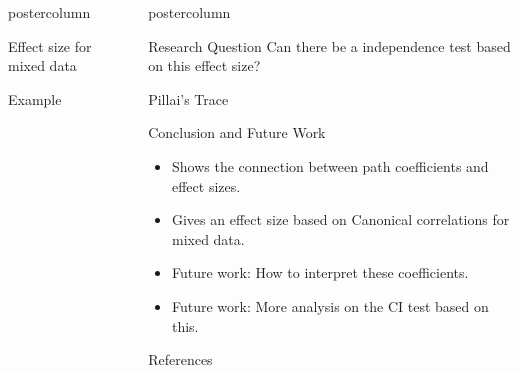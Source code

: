 \documentclass{beamer}
\newlength{\columnheight}
\begin{document}
\begin{frame}
\begin{columns}
\begin{column}{.33\textwidth}
\begin{beamercolorbox}[center]{postercolumn}
\begin{minipage}{.98\textwidth}
{\begin{myblock}{Effect size for mixed data}
	\end{myblock}\vfill
	\begin{myblock}{Example}
	\end{myblock}
		}\end{minipage}\end{beamercolorbox}
	\end{column}


	\begin{column}{0.33\textwidth}
		\begin{beamercolorbox}[center]{postercolumn}
			\begin{minipage}{.98\textwidth} %
				\parbox[t][\columnheight]{\textwidth}{ %
	\begin{myblock}{Research Question}
		Can there be a independence test based on this effect size?
	\end{myblock}\vfill
	\begin{myblock}{Pillai's Trace}
	\end{myblock}\vfill
	\begin{myblock}{Conclusion and Future Work}
		\begin{itemize}
			\item Shows the connection between path coefficients and effect sizes.
			\item Gives an effect size based on Canonical correlations for mixed data.
			\item Future work: How to interpret these coefficients.
			\item Future work: More analysis on the CI test based on this.
		\end{itemize}
	\end{myblock}\vfill
	\begin{myblock}{References}
		\footnotesize
		
		
	\end{myblock}\vfill
		}\end{minipage}\end{beamercolorbox}
	\end{column}
\end{columns}
\end{frame}
\end{document}
